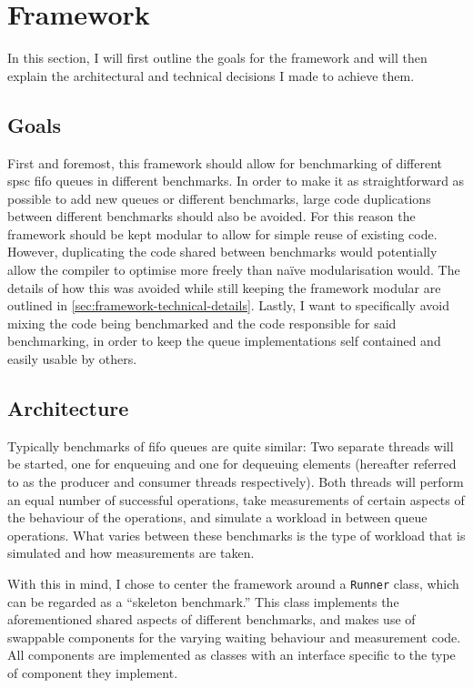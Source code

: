\chapter{Framework}
\label{ch:framework}
In this section, I will first outline the goals for the framework and will then explain the
architectural and technical decisions I made to achieve them.

\section{Goals}
First and foremost, this framework should allow for benchmarking of different \acrshort{spsc} \acrshort{fifo}
queues in different benchmarks.
In order to make it as straightforward as possible to add new queues or different benchmarks, large code
duplications between different benchmarks should also be avoided.
For this reason the framework should be kept modular to allow for simple reuse of existing code.
However, duplicating the code shared between benchmarks would potentially allow the compiler to optimise more
freely than na\"ive modularisation would. The details of how this was avoided while still keeping the
framework modular are outlined in \autoref{sec:framework-technical-details}.
Lastly, I want to specifically avoid mixing the code being benchmarked and the code responsible for said
benchmarking, in order to keep the queue implementations self contained and easily usable by others.

\section{Architecture}
Typically benchmarks of \acrshort{fifo} queues are quite similar\cite{EQueue,B-Queue,MCRingBuffer}:
Two separate threads will be started, one for enqueuing and one for dequeuing elements
(hereafter referred to as the producer and consumer threads respectively).
Both threads will perform an equal number of successful operations, take measurements of certain
aspects of the behaviour of the operations, and simulate a workload in between queue operations.
What varies between these benchmarks is the type of workload that is simulated and how measurements are taken.

With this in mind, I chose to center the framework around a \texttt{Runner} class, which can be regarded as a
``skeleton benchmark.''
This class implements the aforementioned shared aspects of different benchmarks, and makes use of swappable
components for the varying waiting behaviour and measurement code.
All components are implemented as classes with an interface specific to the type of component they implement.

